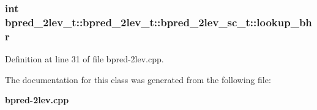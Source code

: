 \subsubsection[{lookup\_\-bhr}]{\setlength{\rightskip}{0pt plus 5cm}int bpred\_\-2lev\_\-t::bpred\_\-2lev\_\-t::bpred\_\-2lev\_\-sc\_\-t::lookup\_\-bhr}\label{classbpred__2lev__t_1_1bpred__2lev__sc__t_ce9ab2f0ce3aacf5e051303e4d64d4cf}




Definition at line 31 of file bpred-2lev.cpp.

The documentation for this class was generated from the following file:\begin{CompactItemize}
\item 
{\bf bpred-2lev.cpp}\end{CompactItemize}
